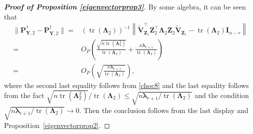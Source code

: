 \documentclass[10pt]{book}
\theoremstyle{definition}
\DeclareMathOperator{\mytr}{tr}
\newcommand{\bZ}{\mathbf{Z}}
\newcommand{\bP}{\mathbf{P}}
\newcommand{\bY}{\mathbf{Y}}
\newcommand{\bI}{\mathbf{I}}
\newcommand{\bV}{\mathbf{V}}
\newcommand{\bfsym}[1]{\ensuremath{\boldsymbol{#1}}}
\def\blambda {\bfsym {\lambda}}
\def\bLambda {\bfsym {\Lambda}}
\begin{document}
\begin{proof}[\textbf{Proof of Proposition \ref{eigenvectorprop3}}]
    By some algebra,
    it can be seen that
    \begin{equation*}
        \begin{split}
            \Big\|
            \bP_{\bY,2}^{*}
            -
            \bP_{\bY,2}^{\dagger}
            \Big\|
            =&
            \left(\mytr(\bLambda_2)\right)^{-1}
            \left\|
            \tilde{\bV}_{\bZ_1}^\top \bZ_2^\top \bLambda_2 \bZ_2 \tilde{\bV}_{\bZ_1}
            -
            \mytr(\bLambda_2)
            \bI_{n-r}
            \right\|
            \\
            =&
            O_P\left(\frac{\sqrt{n\mytr(\bLambda_2^2)}}{\mytr(\bLambda_2)}+\frac{n\blambda_{r+1}}{\mytr(\bLambda_2)}\right)
            \\
            =&
            O_P\left(\sqrt{\frac{n\blambda_{r+1}}{\mytr(\bLambda_2)}}\right)
            ,
        \end{split}
    \end{equation*}
    where the second last equality follows from \eqref{choc8} and the last equality follows from the fact ${\sqrt{n\mytr(\bLambda_2^2)}}/{\mytr(\bLambda_2)}\leq{\sqrt{n\blambda_{r+1}/\mytr(\bLambda_2)}}$ and the condition ${\sqrt{n\blambda_{r+1}/\mytr(\bLambda_2)}}\to 0$.
    Then the conclusion follows from the last display and Proposition~\ref{eigenvectorprop2}.
     
\end{proof}




\end{document}
